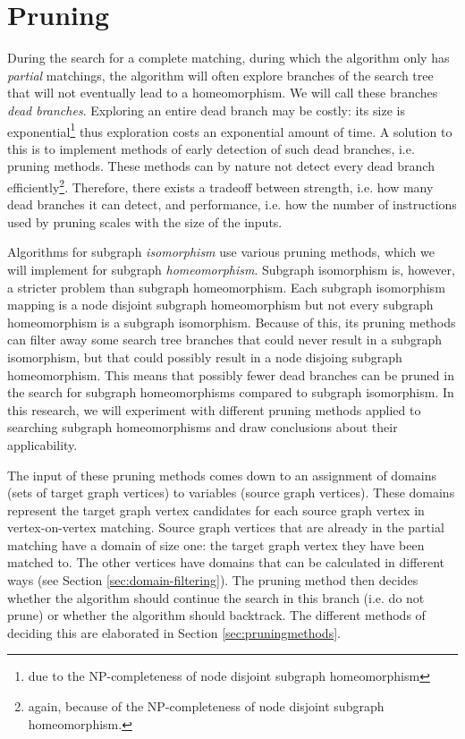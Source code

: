 \chapter{Pruning}
\label{chapter:pruning}

During the search for a complete matching, during which the algorithm only has \textit{partial} matchings, the algorithm will often explore branches of the search tree that will not eventually lead to a homeomorphism. We will call these branches \textit{dead branches}. Exploring an entire dead branch may be costly: its size is exponential\footnote{due to the NP-completeness of node disjoint subgraph homeomorphism} thus exploration costs an exponential amount of time. A solution to this is to implement methods of early detection of such dead branches, i.e. pruning methods. These methods can by nature not detect every dead branch efficiently\footnote{again, because of the NP-completeness of node disjoint subgraph homeomorphism.}. Therefore, there exists a tradeoff between strength, i.e. how many dead branches it can detect, and performance, i.e. how the number of instructions used by pruning scales with the size of the inputs.






Algorithms for subgraph \textit{isomorphism} use various pruning methods, which we will implement for subgraph \textit{homeomorphism}. Subgraph isomorphism is, however, a stricter problem than subgraph homeomorphism. Each subgraph isomorphism mapping is a node disjoint subgraph homeomorphism but not every subgraph homeomorphism is a subgraph isomorphism. Because of this, its pruning methods can filter away some search tree branches that could never result in a subgraph isomorphism, but that could possibly result in a node disjoing subgraph homeomorphism. This means that possibly fewer dead branches can be pruned in the search for subgraph homeomorphisms compared to subgraph isomorphism. In this research, we will experiment with different pruning methods applied to searching subgraph homeomorphisms and draw conclusions about their applicability.

% 
The input of these pruning methods comes down to an assignment of domains (sets of target graph vertices) to variables (source graph vertices). These domains represent the target graph vertex candidates for each source graph vertex in vertex-on-vertex matching. Source graph vertices that are already in the partial matching have a domain of size one: the target graph vertex they have been matched to. The other vertices have domains that can be calculated in different ways (see Section \ref{sec:domain-filtering}). The pruning method then decides whether the algorithm should continue the search in this branch (i.e. do not prune) or whether the algorithm should backtrack. The different methods of deciding this are elaborated in Section \ref{sec:pruningmethods}.


